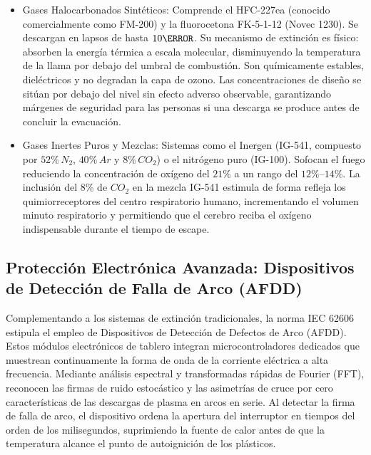 \begin{itemize}
    \item Gases Halocarbonados Sintéticos: Comprende el HFC-227ea (conocido comercialmente como FM-200) y la fluorocetona
          FK-5-1-12 (Novec 1230). Se descargan en lapsos de hasta $10\s$. Su mecanismo de extinción es físico: absorben la
          energía térmica a escala molecular, disminuyendo la temperatura de la llama por debajo del umbral de combustión.
          Son químicamente estables, dieléctricos y no degradan la capa de ozono. Las concentraciones de diseño se sitúan
          por debajo del nivel sin efecto adverso observable,
          garantizando márgenes de seguridad para las personas si una descarga se produce antes de concluir la evacuación.
    \item Gases Inertes Puros y Mezclas: Sistemas como el Inergen (IG-541, compuesto por $52\percent\,N_2$, $40\percent\,Ar$
          y $8\percent\,CO_2$) o el nitrógeno puro (IG-100). Sofocan el fuego reduciendo la concentración de oxígeno del
          $21\percent$ a un rango del $12\percent\text{--}14\percent$. La inclusión del $8\percent$ de $CO_2$ en la mezcla
          IG-541 estimula de forma refleja los quimiorreceptores del centro respiratorio humano, incrementando el volumen
          minuto respiratorio y permitiendo que el cerebro reciba el oxígeno indispensable durante el tiempo de escape.
\end{itemize}

\subsection{Protección Electrónica Avanzada: Dispositivos de Detección de Falla de Arco (AFDD)}

Complementando a los sistemas de extinción tradicionales, la norma IEC 62606 estipula el empleo de Dispositivos de
Detección de Defectos de Arco (AFDD). Estos módulos electrónicos de tablero integran microcontroladores dedicados que
muestrean continuamente la forma de onda de la corriente eléctrica a alta frecuencia. Mediante análisis espectral y
transformadas rápidas de Fourier (FFT), reconocen las firmas de ruido estocástico y las asimetrías de cruce por cero
características de las descargas de plasma en arcos en serie. Al detectar la firma de falla de arco, el dispositivo ordena
la apertura del interruptor en tiempos del orden de los milisegundos, suprimiendo la fuente de calor antes de que la
temperatura alcance el punto de autoignición de los plásticos.

